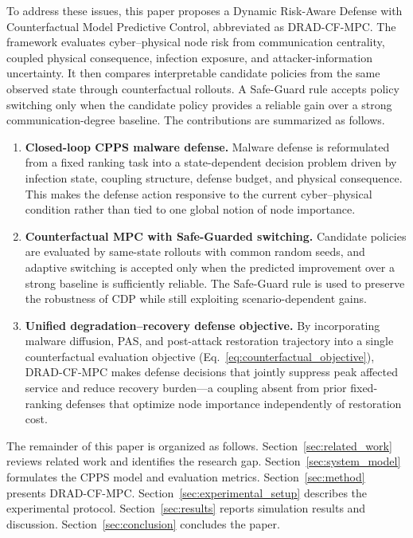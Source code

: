 \documentclass[lettersize,journal]{IEEEtran}
\begin{document}
To address these issues, this paper proposes a Dynamic Risk-Aware Defense with Counterfactual Model Predictive Control, abbreviated as DRAD-CF-MPC. The framework evaluates cyber--physical node risk from communication centrality, coupled physical consequence, infection exposure, and attacker-information uncertainty. It then compares interpretable candidate policies from the same observed state through counterfactual rollouts. A Safe-Guard rule accepts policy switching only when the candidate policy provides a reliable gain over a strong communication-degree baseline. The contributions are summarized as follows.
\begin{enumerate}
    \item \textbf{Closed-loop CPPS malware defense.} Malware defense is reformulated from a fixed ranking task into a state-dependent decision problem driven by infection state, coupling structure, defense budget, and physical consequence. This makes the defense action responsive to the current cyber--physical condition rather than tied to one global notion of node importance.
    \item \textbf{Counterfactual MPC with Safe-Guarded switching.} Candidate policies are evaluated by same-state rollouts with common random seeds, and adaptive switching is accepted only when the predicted improvement over a strong baseline is sufficiently reliable. The Safe-Guard rule is used to preserve the robustness of CDP while still exploiting scenario-dependent gains.
    \item \textbf{Unified degradation--recovery defense objective.} By incorporating malware diffusion, PAS, and post-attack restoration trajectory into a single counterfactual evaluation objective (Eq.~\eqref{eq:counterfactual_objective}), DRAD-CF-MPC makes defense decisions that jointly suppress peak affected service and reduce recovery burden---a coupling absent from prior fixed-ranking defenses that optimize node importance independently of restoration cost.
\end{enumerate}

The remainder of this paper is organized as follows. Section~\ref{sec:related_work} reviews related work and identifies the research gap. Section~\ref{sec:system_model} formulates the CPPS model and evaluation metrics. Section~\ref{sec:method} presents DRAD-CF-MPC. Section~\ref{sec:experimental_setup} describes the experimental protocol. Section~\ref{sec:results} reports simulation results and discussion. Section~\ref{sec:conclusion} concludes the paper.
\end{document}
